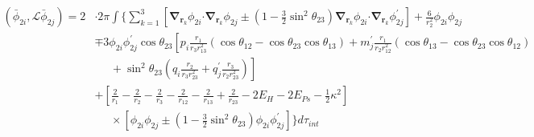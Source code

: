\documentclass[Dissertation.tex]{subfiles}
\begin{document}
\begin{align}
\label{eq:DWavePhi2Phi2}
\left(\bar{\phi}_{2i},\mathcal{L} \bar{\phi}_{2j}\right) = 2 & \cdot 2\pi \int \Bigg\{ \sum_{k=1}^3 \left[ \boldsymbol{\nabla}_{\!\mathbf{r}_k} \nonumber \phi_{2i} \boldsymbol{\cdot} \boldsymbol{\nabla}_{\!\mathbf{r}_k} \phi_{2j} \pm \left(1-\tfrac{3}{2}\sin^2\theta_{23}\right) \boldsymbol{\nabla}_{\!\mathbf{r}_k} \phi_{2i} \boldsymbol{\cdot} \boldsymbol{\nabla}_{\!\mathbf{r}_k} \phi_{2j}^\prime \right]  + \frac{6}{r_2^2}\phi_{2i}\phi_{2j} \\
 \nonumber &\mp 3 \phi_{2i} \phi_{2j}^\prime \cos\theta_{23} \left[p_i \frac{r_1}{r_3 r_{13}^2} (\cos\theta_{12} - \cos\theta_{23} \cos\theta_{13}) + m_j^\prime \frac{r_1}{r_2 r_{12}^2}(\cos\theta_{13} - \cos\theta_{23} \cos\theta_{12})\right.\\
 \nonumber & \left. \;\;\;\;\;  + \sin^2\theta_{23} \left(q_i \frac{r_2}{r_3 r_{23}^2} + q_j^\prime \frac{r_3}{r_2 r_{23}^2} \right) \right] \\
 \nonumber &+ \left. \left[\frac{2}{r_1} - \frac{2}{r_2} - \frac{2}{r_3} - \frac{2}{r_{12}} - \frac{2}{r_{13}} + \frac{2}{r_{23}} - 2 E_H - 2 E_{Ps} - \frac{1}{2}\kappa^2 \right] \right. \\
 &\;\;\;\;\; \times \left[\phi_{2i} \phi_{2j} \pm \left(1-\tfrac{3}{2}\sin^2\theta_{23}\right) \phi_{2i} \phi_{2j}^\prime \right] \Bigg\} d\tau_{int}
\end{align}
\end{document}
